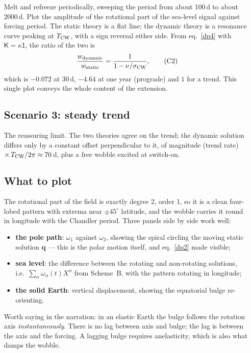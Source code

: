 \documentclass[11pt,a4paper]{article}
\newcommand{\bq}{\mathbf{q}}
\newcommand{\Id}{\mathsf{1}}
\newcommand{\K}{\mathsf{K}}
\begin{document}
Melt and refreeze periodically, sweeping the period from about 100\,d to about 2000\,d. Plot the
amplitude of the rotational part of the sea-level signal against forcing period. The static theory
is a flat line; the dynamic theory is a resonance curve peaking at $T_{\rm CW}$, with a sign
reversal either side. From eq.~\eqref{dp4} with $\K=\kappa\Id$, the ratio of the two is
\begin{equation}
  \frac{w_{\rm dynamic}}{w_{\rm static}}=\frac{1}{1-\nu/\sigma_{\rm CW}},
  \tag{C2}\label{c2}
\end{equation}
which is $-0.072$ at 30\,d, $-4.64$ at one year (prograde) and $1$ for a trend. This single plot
conveys the whole content of the extension.

\subsection{Scenario 3: steady trend}

The reassuring limit. The two theories agree on the trend; the dynamic solution differs only by a
constant offset perpendicular to it, of magnitude (trend rate) $\times\,T_{\rm CW}/2\pi\approx70$\,d,
plus a free wobble excited at switch-on.

\subsection{What to plot}

The rotational part of the field is exactly degree 2, order 1, so it is a clean four-lobed pattern
with extrema near $\pm45^\circ$ latitude, and the wobble carries it round in longitude with the
Chandler period. Three panels side by side work well:
\begin{itemize}
  \item \textbf{the pole path}: $\omega_1$ against $\omega_2$, showing the spiral circling the moving
  static solution $\bq$ --- this is the polar motion itself, and eq.~\eqref{dp2} made visible;
  \item \textbf{sea level}: the difference between the rotating and non-rotating solutions, i.e.\
  $\sum_\alpha\omega_\alpha(t)X^\alpha$ from Scheme~B, with the pattern rotating in longitude;
  \item \textbf{the solid Earth}: vertical displacement, showing the equatorial bulge re-orienting.
\end{itemize}
Worth saying in the narration: in an elastic Earth the bulge follows the rotation axis
\emph{instantaneously}. There is no lag between axis and bulge; the lag is between the axis and the
forcing. A lagging bulge requires anelasticity, which is also what damps the wobble.
\end{document}
